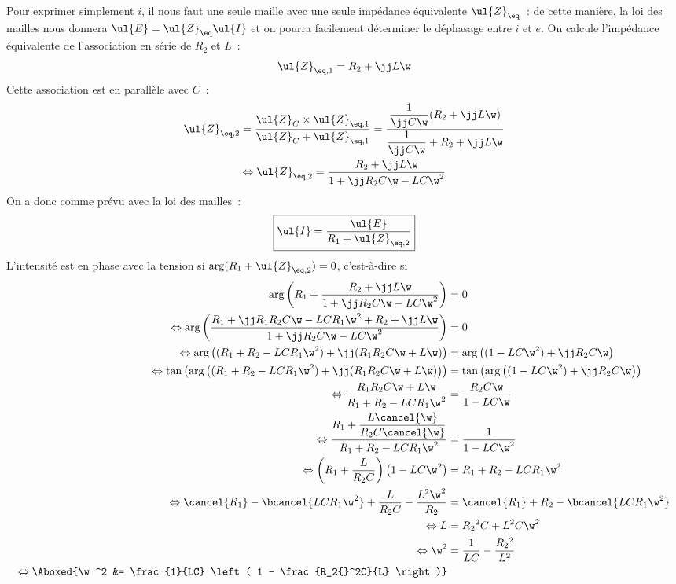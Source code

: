 \documentclass[a4paper, 12pt, final, garamond]{book}
\begin{document}
Pour exprimer simplement $i$, il nous faut une seule maille avec une seule
impédance équivalente $\ul{Z}_{\eq}$~: de cette manière, la loi des mailles nous
donnera $\ul{E} = \ul{Z}_{\eq}\ul{I}$ et on pourra facilement déterminer le
déphasage entre $i$ et $e$. \bigbreak
On calcule l'impédance équivalente de l'association en série de $R_2$ et $L$~:
\[\ul{Z}_{\eq,1} = R_2 + \jj L\w\]
Cette association est en parallèle avec $C$~:
\begin{gather*}
    \ul{Z}_{\eq, 2}
        = \frac{\ul{Z}_C\times\ul{Z}_{\eq, 1}}{\ul{Z}_C + \ul{Z}_{\eq,1}}
        = \frac{\dfrac{1}{\jj C\w}(R_2 + \jj L\w)}{\dfrac{1}{\jj C\w} + R_2 +
            \jj L\w}\\
    \Leftrightarrow
    \ul{Z}_{\eq,2} = \frac{R_2 + \jj L\w}{1+\jj R_2C\w - LC\w^2}
\end{gather*}
On a donc comme prévu avec la loi des mailles~:
\[\boxed{\ul{I} = \frac{\ul{E}}{R_1 + \ul{Z}_{\eq,2}}}\]
L'intensité est en phase avec la tension si $\arg(R_1 + \ul{Z}_{\eq,2}) = 0$,
c'est-à-dire si
\begin{align*}
    \arg\left(R_1 + \frac{R_2 + \jj L\w}{1 + \jj R_2C\w - LC\w^2}\right)
        &= 0\\
    \Leftrightarrow
    \arg \left( \frac{R_1 + \jj R_1R_2C\w - LCR_1\w^2 + R_2 + \jj L\w}
        {1 + \jj R_2 C\w - LC\w^2} \right)
        &= 0\\
    \Leftrightarrow
    \arg \left( (R_1 + R_2 - LCR_1\w^2) + \jj(R_1R_2C\w + L\w) \right)
        & = \arg \left( (1-LC\w^2) + \jj R_2C\w \right)\\
    \Leftrightarrow
    \tan \left(\arg \left( (R_1 + R_2 - LCR_1\w^2) + \jj(R_1R_2C\w + L\w) \right)\right)
        & = \tan\left(\arg \left( (1-LC\w^2) + \jj R_2C\w \right)\right)\\
    \Leftrightarrow
    \frac{R_1R_2C\w + L\w}{R_1 + R_2 - LCR_1\w^2}
        &= \frac{R_2C\w}{1-LC\w}\\
    \Leftrightarrow
    \frac{R_1 + \dfrac{L\cancel{\w}}{R_2C\cancel{\w}}}{R_1 + R_2 - LCR_1\w^2}
        &= \frac{1}{1-LC\w^2}\\
    \Leftrightarrow
    \left( R_1 + \frac{L}{R_2C} \right) \left( 1-LC\w^2 \right)
        &= R_1 + R_2 - LCR_1\w^2\\
    \Leftrightarrow
    \cancel{R_1} - \bcancel{LCR_1\w^2} + \frac{L}{R_2C} - \frac{L^2\w^2}{R_2}
        &= \cancel{R_1} + R_2 - \bcancel{LCR_1\w^2}\\
    \Leftrightarrow
    L
        &= R_2{}^2 C + L^2C\w^2\\
    \Leftrightarrow
    \w^2
        &= \frac{1}{LC} - \frac{R_2{}^2}{L^2}\\
    \Leftrightarrow
    \Aboxed{\w^2
        &= \frac{1}{LC} \left( 1 - \frac{R_2{}^2C}{L} \right)}
\end{align*}
\end{document}
